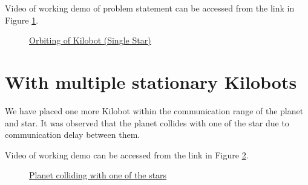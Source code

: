 \documentclass{report}[12pt]
\begin{document}
Video of working demo of problem statement can be accessed from the link in Figure \ref{fig:planet-star-demo}.

\begin{figure}[H]
	\centering
	\caption{\href{https://drive.google.com/open?id=1j-bFCbUoinQfT9sqNYdseDKCSMbgUR3y}{Orbiting of Kilobot (Single Star)}}
	\label{fig:planet-star-demo}
\end{figure}

\section{With multiple stationary Kilobots}
We have placed one more Kilobot within the communication range of the planet and star. It was observed that the planet collides with one of the star due to communication delay between them.

Video of working demo can be accessed from the link in Figure \ref{fig:planet-star-collision}.

\begin{figure}[H]
	\centering
	\caption{\href{https://drive.google.com/open?id=1gF9iI-mOKVoa7VgCKw3sjqGuXj6nrcXy}{Planet colliding with one of the stars}}
	\label{fig:planet-star-collision}
\end{figure}
\end{document}
